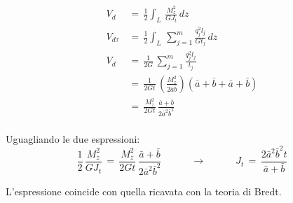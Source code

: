 \begin{align*}
   V_{d} \,&=\, \frac{1}{2} \int_L \,\frac{M_z^2}{GJ_t} \,dz\\
    V_{d\tau} \,&=\, \frac{1}{2} \int_L \,\sum^m_{j=1}\frac{q_j^2l_j}{Gt_j} \,dz\\
        V_d   &=\, \frac{1}{2G} \,\sum^m_{j=1}\frac{q_j^2l_j}{t_j} \\
         &=\, \frac{1}{2Gt} \,\left(  \frac{M_z^2}{2\bar{a} \bar{b}}  \right) \left(  \bar{a} +\bar{b} +\bar{a} +\bar{b}  \right) \\
      &=\, \frac{M_z^2}{2Gt} \,\frac{\bar{a} +\bar{b}}{2\bar{a}^2 \bar{b}^2}\\
\end{align*}

Uguagliando le due espressioni:
\begin{equation*}
    \frac{1}{2} \,\frac{M_z^2}{GJ_t}\,=\, \frac{M_z^2}{2Gt} \,\frac{\bar{a} +\bar{b}}{2\bar{a}^2 \bar{b}^2}
    \quad\quad\quad\rightarrow\quad\quad\quad
    J_t\,=\,\frac{2\bar{a}^2 \bar{b}^2t}{\bar{a} +\bar{b}}
\end{equation*}

L'espressione coincide con quella ricavata con la teoria di Bredt.

